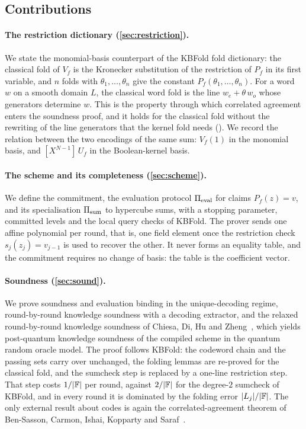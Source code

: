 \subsection{Contributions}\label{sec:intro:contrib}

\paragraph{The restriction dictionary (\cref{sec:restriction}).}
We state the monomial-basis counterpart of the KBFold fold dictionary: the classical fold of $V_f$ is the Kronecker substitution of the restriction of $P_f$ in its first variable, and $n$ folds with $\theta_1,\dots,\theta_n$ give the constant $P_f(\theta_1,\dots,\theta_n)$.
For a word $w$ on a smooth domain $L$, the classical word fold is the line $w_e + \theta\, w_o$ whose generators determine $w$.
This is the property through which correlated agreement enters the soundness proof, and it holds for the classical fold without the rewriting of the line generators that the kernel fold needs ().
We record the relation between the two encodings of the same sum: $V_f(1)$ in the monomial basis, and $[X^{N-1}]\,U_f$ in the Boolean-kernel basis.

\paragraph{The scheme and its completeness (\cref{sec:scheme}).}
We define the commitment, the evaluation protocol $\Pi_{\mathrm{eval}}$ for claims $P_f(z) = v$, and its specialisation $\Pi_{\mathrm{sum}}$ to hypercube sums, with a stopping parameter, committed levels and the local query checks of KBFold.
The prover sends one affine polynomial per round, that is, one field element once the restriction check $s_j(z_j) = v_{j-1}$ is used to recover the other.
It never forms an equality table, and the commitment requires no change of basis: the table is the coefficient vector.

\paragraph{Soundness (\cref{sec:sound}).}
We prove soundness and evaluation binding in the unique-decoding regime, round-by-round knowledge soundness with a decoding extractor, and the relaxed round-by-round knowledge soundness of Chiesa, Di, Hu and Zheng~\cite{CDHZ25}, which yields post-quantum knowledge soundness of the compiled scheme in the quantum random oracle model.
The proof follows KBFold: the codeword chain and the passing sets carry over unchanged, the folding lemmas are re-proved for the classical fold, and the sumcheck step is replaced by a one-line restriction step.
That step costs $1/|\mathbb{F}|$ per round, against $2/|\mathbb{F}|$ for the degree-$2$ sumcheck of KBFold, and in every round it is dominated by the folding error $|L_j|/|\mathbb{F}|$.
The only external result about codes is again the correlated-agreement theorem of Ben-Sasson, Carmon, Ishai, Kopparty and Saraf~\cite{BCIKS23}.

